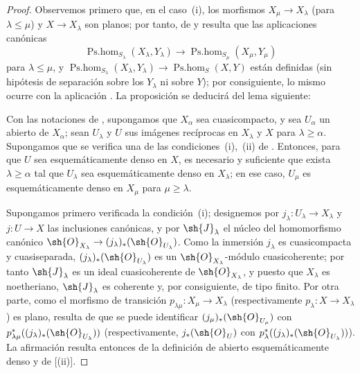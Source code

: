 \begin{proof}
Observemos primero que, en el caso~(i), los morfismos $X_\mu\to X_\lambda$ (para $\lambda\leq\mu$) y $X\to X_\lambda$ son planos; por tanto, de  y  resulta que las aplicaciones canónicas
\[
  \operatorname{Ps.hom}_{S_\lambda}(X_\lambda,Y_\lambda)\to\operatorname{Ps.hom}_{S_\mu}(X_\mu,Y_\mu)
\]
para $\lambda\leq\mu$, y $\operatorname{Ps.hom}_{S_\lambda}(X_\lambda,Y_\lambda)\to\operatorname{Ps.hom}_S(X,Y)$ están definidas (sin hipótesis de separación sobre los $Y_\lambda$ ni sobre $Y$); por consiguiente, lo mismo ocurre con la aplicación .
La proposición se deducirá del lema siguiente:

\begin{lemma}[20.3.8.2]
\label{IV.20.3.8.2}
Con las notaciones de , supongamos que $X_\alpha$ sea cuasicompacto, y sea $U_\alpha$ un abierto de $X_\alpha$; sean $U_\lambda$ y $U$ sus imágenes recíprocas en $X_\lambda$ y $X$ para $\lambda\geq\alpha$.
Supongamos que se verifica una de las condiciones~\textup{(i)},~\textup{(ii)} de .
Entonces, para que $U$ sea esquemáticamente denso en $X$, es necesario y suficiente que exista $\lambda\geq\alpha$ tal que $U_\lambda$ sea esquemáticamente denso en $X_\lambda$; en ese caso, $U_\mu$ es esquemáticamente denso en $X_\mu$ para $\mu\geq\lambda$.
\end{lemma}

Supongamos primero verificada la condición~(i); designemos por $j_\lambda:U_\lambda\to X_\lambda$ y $j:U\to X$ las inclusiones canónicas, y por $\sh{J}_\lambda$ el núcleo del homomorfismo canónico $\sh{O}_{X_\lambda}\to(j_\lambda)_*(\sh{O}_{U_\lambda})$.
Como la inmersión $j_\lambda$ es cuasicompacta y cuasiseparada, $(j_\lambda)_*(\sh{O}_{U_\lambda})$ es un $\sh{O}_{X_\lambda}$-módulo cuasicoherente; por tanto $\sh{J}_\lambda$ es un ideal cuasicoherente de $\sh{O}_{X_\lambda}$, y puesto que $X_\lambda$ es noetheriano, $\sh{J}_\lambda$ es coherente y, por consiguiente, de tipo finito.
Por otra parte, como el morfismo de transición $p_{\lambda\mu}:X_\mu\to X_\lambda$ (respectivamente $p_\lambda:X\to X_\lambda$) es plano, resulta de  que se puede identificar $(j_\mu)_*(\sh{O}_{U_\mu})$ con $p_{\lambda\mu}^*((j_\lambda)_*(\sh{O}_{U_\lambda}))$ (respectivamente, $j_*(\sh{O}_U)$ con $p_\lambda^*((j_\lambda)_*(\sh{O}_{U_\lambda}))$).
La afirmación resulta entonces de la definición de abierto esquemáticamente denso y de [(ii)].


\end{proof}
